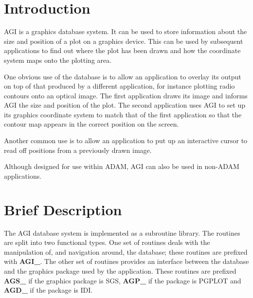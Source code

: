 

\newpage

\setlength{\parskip}{0mm}
\tableofcontents
\setlength{\parskip}{\medskipamount}
\markright{\stardocname}

\newpage

\section {Introduction}

AGI is a graphics database system. It can be used to store information
about the size and position of a plot on a graphics device. This can be
used by subsequent applications to find out where the plot has been drawn
and how the coordinate system maps onto the plotting area.

One obvious use of the database is to allow an application to overlay
its output on top of that produced by a different application, for instance
plotting radio contours onto an optical image. The first application draws
its image and informs AGI the size and position of the plot. The second
application uses AGI to set up its graphics coordinate system to match
that of the first application so that the contour map appears in the
correct position on the screen.

Another common use is to allow an application to put up an interactive
cursor to read off positions from a previously drawn image.

Although designed for use within ADAM, AGI can also be used in non-ADAM
applications.

\section {Brief Description}

The AGI database system is implemented as a subroutine library.
The routines are split into two functional types. One set of
routines deals with the manipulation of, and navigation around, the
database; these routines are prefixed with {\bf AGI\_}. The other set of
routines provides an interface between the database and the graphics
package used by the application. These routines are prefixed {\bf AGS\_}
if the graphics package is SGS, {\bf AGP\_} if the package is PGPLOT and
{\bf AGD\_} if the package is IDI.

